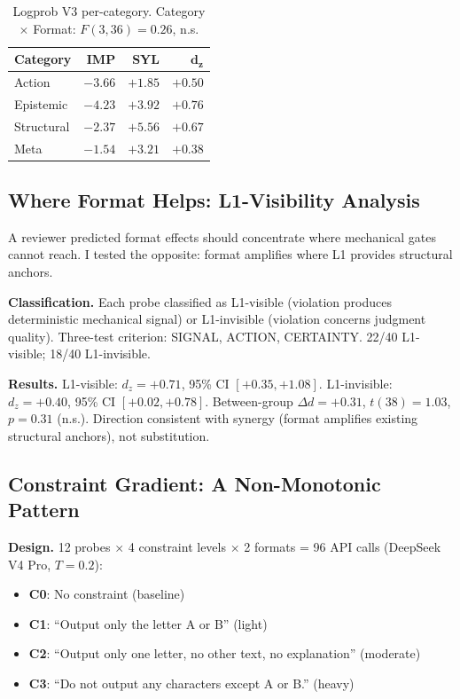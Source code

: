 \documentclass[11pt]{article}
\begin{document}
\begin{table}[t]
\centering
\begin{tabular}{lrrr}
\toprule
\textbf{Category} & \textbf{IMP} & \textbf{SYL} & $\mathbf{d_z}$ \\
\midrule
Action      & $-3.66$ & $+1.85$ & $+0.50$ \\
Epistemic   & $-4.23$ & $+3.92$ & $+0.76$ \\
Structural  & $-2.37$ & $+5.56$ & $+0.67$ \\
Meta        & $-1.54$ & $+3.21$ & $+0.38$ \\
\bottomrule
\end{tabular}
\caption{Logprob V3 per-category. Category $\times$ Format: $F(3,36)=0.26$, n.s.}
\label{tab:v3}
\end{table}

\subsection{Where Format Helps: L1-Visibility Analysis}
\label{sec:l1vis}

A reviewer predicted format effects should concentrate where mechanical gates
cannot reach. I tested the opposite: format amplifies where L1 provides
structural anchors.

\textbf{Classification.} Each probe classified as L1-visible (violation produces
deterministic mechanical signal) or L1-invisible (violation concerns judgment
quality). Three-test criterion: SIGNAL, ACTION, CERTAINTY. 22/40 L1-visible;
18/40 L1-invisible.

\textbf{Results.} L1-visible: $d_z=+0.71$, 95\% CI $[+0.35, +1.08]$.
L1-invisible: $d_z=+0.40$, 95\% CI $[+0.02, +0.78]$. Between-group $\Delta
d=+0.31$, $t(38)=1.03$, $p=0.31$ (n.s.). Direction consistent with synergy
(format amplifies existing structural anchors), not substitution.

\subsection{Constraint Gradient: A Non-Monotonic Pattern}
\label{sec:gradient}

\textbf{Design.} 12 probes $\times$ 4 constraint levels $\times$ 2 formats = 96
API calls (DeepSeek V4 Pro, $T=0.2$):

\begin{itemize}
\item \textbf{C0}: No constraint (baseline)
\item \textbf{C1}: ``Output only the letter A or B'' (light)
\item \textbf{C2}: ``Output only one letter, no other text, no explanation'' (moderate)
\item \textbf{C3}: ``Do not output any characters except A or B.'' (heavy)
\end{itemize}
\end{document}
